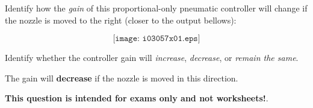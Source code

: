 

Identify how the {\it gain} of this proportional-only pneumatic controller will change if the nozzle is moved to the right (closer to the output bellows):

$$\texttt{[image: i03057x01.eps]}$$

Identify whether the controller gain will {\it increase}, {\it decrease}, or {\it remain the same}.

\vskip 30pt







The gain will {\bf decrease} if the nozzle is moved in this direction.







{\bf This question is intended for exams only and not worksheets!}.



